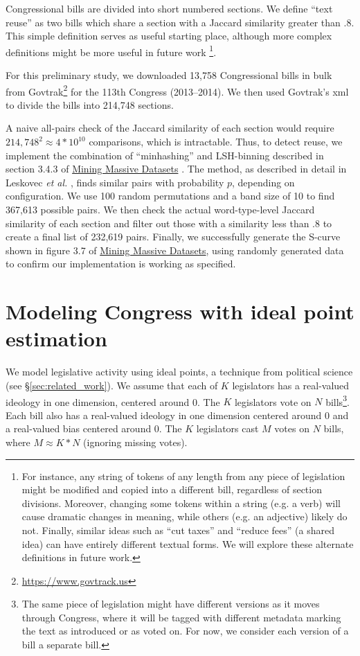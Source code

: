 \documentclass{article}
\begin{document}
Congressional bills are divided into short numbered sections. We define ``text reuse'' as two bills which share a section with a Jaccard similarity greater than .8. This simple definition serves as useful starting place, although more complex definitions might be more useful in future work \footnote{For instance, any string of tokens of any length from any piece of legislation might be modified and copied into a different bill, regardless of section divisions. Moreover, changing some tokens within a string (e.g. a verb) will cause dramatic changes in meaning, while others (e.g. an adjective) likely do not. Finally, similar ideas such as ``cut taxes'' and ``reduce fees'' (a shared idea) can have entirely different textual forms. We will explore these alternate definitions in future work.}.

For this preliminary study, we downloaded 13,758 Congressional bills in bulk from Govtrak\footnote{\url{https://www.govtrack.us}} for the 113th Congress (2013--2014). We then used Govtrak's xml to divide the bills into 214,748 sections.

A naive all-pairs check of the Jaccard similarity of each section would require $214,748^2 \approx 4 * 10^{10}$  comparisons, which is intractable. Thus, to detect reuse, we implement the combination of ``minhashing'' and LSH-binning described in section 3.4.3 of \underline{Mining Massive Datasets} \cite{Rajaraman2011MiningOM}. The method, as described in detail in Leskovec \textit{et al.} \cite{Rajaraman2011MiningOM}, finds similar pairs with probability $p$, depending on configuration. We use 100 random permutations and a band size of 10 to find 367,613 possible pairs. We then check the actual word-type-level Jaccard similarity of each section and filter out those with a similarity less than .8 to create a final list of 232,619 pairs. Finally, we successfully generate the S-curve shown in figure 3.7 of \underline{Mining Massive Datasets}, using randomly generated data to confirm our implementation is working as specified\cite{Rajaraman2011MiningOM}.

\section{Modeling Congress with ideal point estimation}

We model legislative activity using ideal points, a technique from political science (see \S\ref{sec:related_work}). We assume that each of $K$ legislators has a real-valued ideology in one dimension, centered around 0. The $K$ legislators vote on $N$ bills\footnote{The same piece of legislation might have different versions as it moves through Congress, where it will be tagged with different metadata marking the text as introduced or as voted on. For now, we consider each version of a bill a separate bill.}. Each bill also has a real-valued ideology in one dimension centered around 0 and a real-valued bias centered around 0. The $K$ legislators cast $M$ votes on $N$ bills, where $M \approx K * N$ (ignoring missing votes). 
\end{document}
